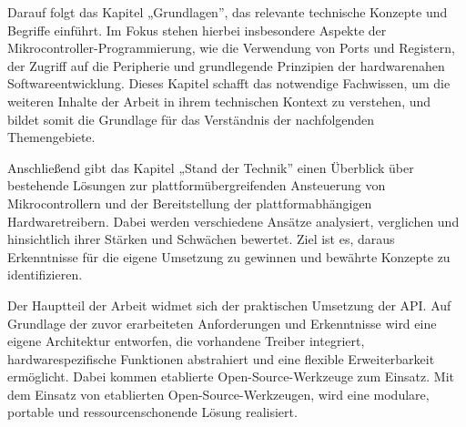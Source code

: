 Darauf folgt das Kapitel „Grundlagen”, das relevante technische Konzepte und Begriffe einführt. 
Im Fokus stehen hierbei insbesondere Aspekte der Mikrocontroller-Programmierung, wie die Verwendung von Ports und Registern, der Zugriff auf die Peripherie und grundlegende Prinzipien der hardwarenahen Softwareentwicklung. 
Dieses Kapitel schafft das notwendige Fachwissen, um die weiteren Inhalte der Arbeit in ihrem technischen Kontext zu verstehen, und bildet somit die Grundlage für das Verständnis der nachfolgenden Themengebiete.

Anschließend gibt das Kapitel „Stand der Technik” einen Überblick über bestehende Lösungen zur plattformübergreifenden Ansteuerung von Mikrocontrollern und der Bereitstellung der plattformabhängigen Hardwaretreibern.
Dabei werden verschiedene Ansätze analysiert, verglichen und hinsichtlich ihrer Stärken und Schwächen bewertet. 
Ziel ist es, daraus Erkenntnisse für die eigene Umsetzung zu gewinnen und bewährte Konzepte zu identifizieren.

Der Hauptteil der Arbeit widmet sich der praktischen Umsetzung der API.
Auf Grundlage der zuvor erarbeiteten Anforderungen und Erkenntnisse wird eine eigene Architektur entworfen, die vorhandene Treiber integriert, hardwarespezifische Funktionen abstrahiert und eine flexible Erweiterbarkeit ermöglicht.
Dabei kommen etablierte Open-Source-Werkzeuge zum Einsatz.
Mit dem Einsatz von etablierten Open-Source-Werkzeugen, wird eine modulare, portable und ressourcenschonende Lösung realisiert.






















